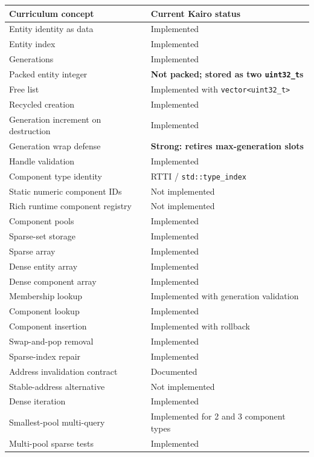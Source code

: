 {\def\LTcaptype{none} %
\begin{longtable}[]{@{}ll@{}}
\toprule\noalign{}
Curriculum concept & Current Kairo status \\
\midrule\noalign{}
\endhead
\bottomrule\noalign{}
\endlastfoot
Entity identity as data & Implemented \\
Entity index & Implemented \\
Generations & Implemented \\
Packed entity integer & \textbf{Not packed; stored as two \texttt{uint32\_t}s} \\
Free list & Implemented with \texttt{vector\textless{}uint32\_t\textgreater{}} \\
Recycled creation & Implemented \\
Generation increment on destruction & Implemented \\
Generation wrap defense & \textbf{Strong: retires max-generation slots} \\
Handle validation & Implemented \\
Component type identity & RTTI / \texttt{std::type\_index} \\
Static numeric component IDs & Not implemented \\
Rich runtime component registry & Not implemented \\
Component pools & Implemented \\
Sparse-set storage & Implemented \\
Sparse array & Implemented \\
Dense entity array & Implemented \\
Dense component array & Implemented \\
Membership lookup & Implemented with generation validation \\
Component lookup & Implemented \\
Component insertion & Implemented with rollback \\
Swap-and-pop removal & Implemented \\
Sparse-index repair & Implemented \\
Address invalidation contract & Documented \\
Stable-address alternative & Not implemented \\
Dense iteration & Implemented \\
Smallest-pool multi-query & Implemented for 2 and 3 component types \\
Multi-pool sparse tests & Implemented \\

\end{longtable}}
